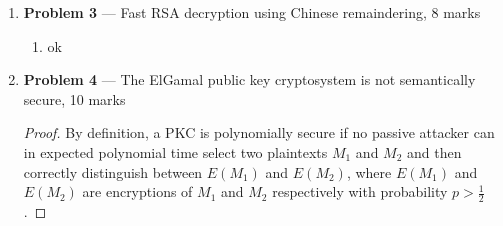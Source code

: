 \documentclass[11pt]{article}
\theoremstyle{definition}
\renewcommand{\pmod}[1]{\mbox{\ $(\ensuremath{\operatorname{mod}}\ {#1})$}}
\begin{document}
\begin{enumerate}
\begin{enumerate}
\begin{enumerate}
\begin{proof}
          \begin{align*}
            \text{\textbf{Case }} b_{i + 1} = 1 \\
            a^{s_p + 1} &\equiv a^{2s_p + b_{p + 1}} \\
                        &\equiv a^{s_p} \times a^{s_p} \times a^{b_{p + 1}} \\
                        &\equiv r^2_{p} \times a^{b_{p + 1}} \\
                        &\equiv r^2_{p} \times a \pmod{m}
          \end{align*}

          Therefore, $r_{p + 1} \equiv a^{p + 1} \pmod{m}$ and $r_i \equiv a^i \pmod{m}$
        \end{proof}
      \item
        \begin{proof}
          Given proof of $(ii)$, we can say that $a^n \equiv r_k \pmod{m}$, where $n = s_k$. Therefore,
          \begin{align*}
            a^{s_k} &\equiv a^{2s_{k - 1} + b_k} \\
                    &\equiv (a^{s_{k - 1}})^2 \times a^{b_k} \\
                    &\equiv (r_{k - 1})^2 \times a^{b_k} \\
                    &\equiv r_k \pmod{m}
          \end{align*}
        \end{proof}
    \end{enumerate}
\end{enumerate}

\newpage

\item[] \textbf{Problem 3} --- Fast RSA decryption using Chinese remaindering, 8 marks

\begin{enumerate}
  \item ok
\end{enumerate}

\newpage

\item[] \textbf{Problem 4} --- The ElGamal public key cryptosystem is not semantically secure, 10 marks

\begin{proof}
  By definition, a PKC is polynomially secure if no passive attacker can in expected polynomial time select two plaintexts $M_1$ and $M_2$ and then correctly distinguish between $E(M_1)$ and $E(M_2)$, where $E(M_1)$ and $E(M_2)$ are encryptions of $M_1$ and $M_2$ respectively with probability $p > \frac{1}{2}$.


\end{proof}
\end{enumerate}
\end{document}
